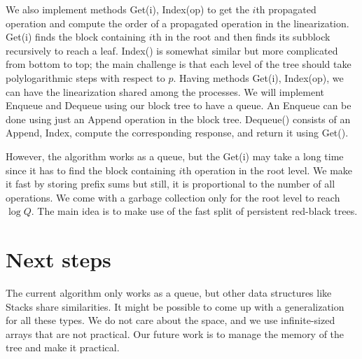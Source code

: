 \documentclass[12pt]{article}
\begin{document}
We also implement methods Get(i), Index(op) to get the $i$th propagated operation and compute the order of a propagated operation in the linearization. Get(i) finds the block containing $i$th in the root and then finds its subblock recursively to reach a leaf. Index() is somewhat similar but more complicated from bottom to top; the main challenge is that each level of the tree should take polylogarithmic steps with respect to $p$. Having methods Get(i), Index(op), we can have the linearization shared among the processes. We will implement Enqueue and Dequeue using our block tree to have a queue. An Enqueue can be done using just an Append operation in the block tree. Dequeue() consists of an Append, Index, compute the corresponding response, and return it using Get().

However, the algorithm works as a queue, but the Get(i)  may take a long time since it has to find the block containing $i$th operation in the root level. We make it fast by storing prefix sums but still, it is proportional to the number of all operations. We come with a garbage collection only for the root level to reach $\log Q$. The main idea is to make use of the fast split of persistent red-black trees.

\section{Next steps}
The current algorithm only works as a queue, but other data structures like Stacks share similarities. It might be possible to come up with a generalization for all these types. We do not care about the space, and we use infinite-sized arrays that are not practical. Our future work is to manage the memory of the tree and make it practical.



 

\end{document}
